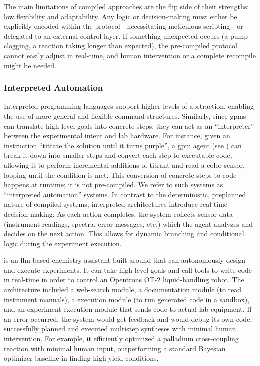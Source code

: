 The main limitations of compiled approaches are the flip side of their strengths: low flexibility and adaptability. 
Any logic or decision-making must either be explicitly encoded within the protocol---necessitating meticulous scripting---or delegated to an external control layer.\autocite{mehr2023digitizing,leonov2024integrated} 
If something unexpected occurs (a pump clogging, a reaction taking longer than expected), the pre-compiled protocol cannot easily adjust in real-time, and human intervention or a complete recompile might be needed.

\subsubsection{Interpreted Automation}
Interpreted programming languages support higher levels of abstraction, enabling the use of more general and flexible command structures. 
Similarly, since \glspl{gpm} can translate high-level goals into concrete steps\autocite{ahn2022can, huang2022language}, they can act as an \enquote{interpreter} between the experimental intent and lab hardware. 
For instance, given an instruction \enquote{titrate the solution until it turns purple}, a \gls{gpm} agent (see ) can break it down into smaller steps and convert each step to executable code, allowing it to perform incremental additions of titrant and read a color sensor, looping until the condition is met. 
This conversion of concrete steps to code happens at runtime; it is not pre-compiled. 
We refer to such systems as \enquote{interpreted automation} systems. 
In contrast to the deterministic, preplanned nature of compiled systems, interpreted architectures introduce real-time decision-making.
As each action completes, the system collects sensor data (instrument readings, spectra, error messages, etc.) which the agent analyzes and decides on the next action. This allows for dynamic branching and conditional logic during the experiment execution. 

 \autocite{boiko2023autonomous} is an \gls{llm}-based chemistry assistant built around  that can autonomously design and execute experiments. 
It can take high-level goals and call tools to write code in real-time in order to control an Opentrons OT-2 liquid-handling robot. The architecture included a web-search module, a documentation module (to read instrument manuals), a  execution module (to run generated code in a sandbox), and an experiment execution module that sends code to actual lab equipment.
If an error occurred, the system would get feedback and  would debug its own code.  successfully planned and executed multistep syntheses with minimal human intervention. 
For example, it efficiently optimized a palladium cross-coupling reaction with minimal human input, outperforming a standard Bayesian optimizer baseline in finding high-yield conditions.

